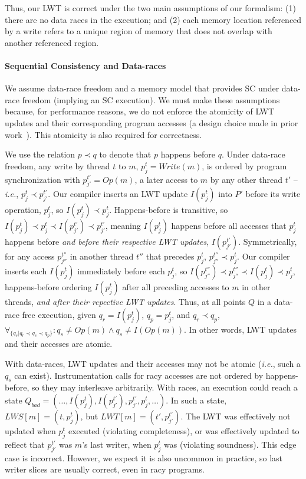 \documentclass[preprint,9pt]{sigplanconf}
\newcommand{\lwt}{LWT\xspace}
\begin{document}
Thus, our \lwt is correct under the two main assumptions of our formalism: (1)
there are no data races in the execution; and (2) each memory location
referenced by a write refers to a unique region of memory that does not overlap
with another referenced region.  

\paragraph{Sequential Consistency and Data-races}

We assume data-race freedom and a memory model that provides SC under data-race
freedom (implying an SC execution).  We must make these assumptions because,
for performance reasons, we do not enforce the atomicity of \lwt updates and
their corresponding program accesses (a design choice made in prior
work~\cite{fasttrack,recon}).  This atomicity is also required for correctness.    

We use the relation $p \prec q$ to denote that $p$ happens before $q$.  Under
data-race freedom, any write by thread $t$ to $m$, $p^{t}_{j} = Write(m)$,  is
ordered by program synchronization with $p^{t'}_{j'} = Op(m)$, a later access to
$m$ by any other thread $t'$ -- {\em i.e.}, $p^{t}_{j} \prec p^{t'}_{j'}$.  Our
compiler inserts an \lwt update $I(p^{t}_{j})$ into $P'$ before its write
operation, $p^{t}_{j}$, so $I(p^{t}_{j}) \prec p^{t}_{j}$.  Happens-before is
transitive, so $I(p^{t}_{j}) \prec p^{t}_{j} \prec I(p^{t'}_{j'}) \prec
p^{t'}_{j'}$, meaning $I(p^{t}_{j})$ happens before all accesses that
$p^{t}_{j}$ happens before {\em and before their respective \lwt updates},
$I(p^{t'}_{j'})$.  Symmetrically, for any access $p^{t''}_{j''}$ in another
thread $t''$ that precedes $p^{t}_{j}$, $p^{t''}_{j''} \prec p^{t}_{j}$.  Our
compiler inserts each $I(p^{t}_{j})$ immediately before each $p^{t}_{j}$, so
$I(p^{t''}_{j''}) \prec p^{t''}_{j''} \prec I(p^{t}_{j}) \prec p^{t}_{j}$,
happens-before ordering $I(p^{t}_{j})$ after all preceding accesses to $m$ in
other threads, {\em and after their repective \lwt updates}.  Thus, at all
points $Q$ in a data-race free execution, given $q_r = I(p^{t}_{j})$, $q_p =
p^{t}_{j}$, and $q_r \prec q_p$, $\forall_{ \{q_s | q_r \prec q_s \prec q_p
\}}: q_s \ne Op(m) \wedge q_s \ne I(Op(m)) $.  In other words, \lwt updates and
their accesses are atomic.

With data-races, \lwt updates and their accesses may not be atomic ({\em i.e.},
such a $q_s$ can exist).  Instrumentation calls for racy accesses are not
ordered by happens-before, so they may interleave arbitrarily.  With races, an
execution could reach a state $Q_{bad} = (\ldots, I(p^{t}_{j}), I(p^{t'}_{j'}),
p^{t'}_{j'}, p^{t}_{j}, \ldots)$.  In such a state, $LWS[m] = (t,p^{t}_{j})$,
but $LWT[m] = (t',p^{t'}_{j'})$.  The \lwt was effectively not updated when
$p^{t}_{j}$ executed (violating completeness), or was effectively updated to
reflect that $p^{t'}_{j'}$ was $m$'s last writer, when $p^{t}_{j}$ was
(violating soundness).  This edge case is incorrect. However, we expect it is
also uncommon in practice, so last writer slices are usually correct, even in
racy programs.
\end{document}
